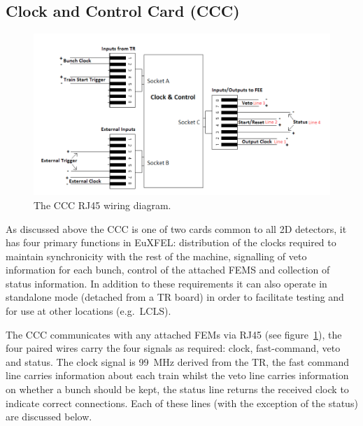 \subsection{Clock and Control Card (CCC)} %
\label{sub:clock_and_control_card}
\begin{figure}[h]
  \centering
    \includegraphics[width=.9\textwidth]{appendix_XFEL/images/Other/CCC_RJ45_diagram.png}
  \caption{The CCC RJ45 wiring diagram.}
  \label{fig:CCC_RJ45_diagram}
\end{figure}

As discussed above the CCC is one of two cards common to all 2D detectors, it has four primary functions in EuXFEL: distribution of the clocks required to maintain synchronicity with the rest of the machine, signalling of veto information for each bunch, control of the attached FEMS and collection of status information. In addition to these requirements it can also operate in standalone mode (detached from a TR board) in order to facilitate testing and for use at other locations (e.g.\ LCLS). 

The CCC communicates with any attached FEMs via RJ45 (see figure~\ref{fig:CCC_RJ45_diagram}), the four paired wires carry the four signals as required: clock, fast-command, veto and status. The clock signal is 99~MHz derived from the TR, the fast command line carries information about each train whilst the veto line carries information on whether a bunch should be kept, the status line returns the received clock to indicate correct connections. Each of these lines (with the exception of the status) are discussed below.

